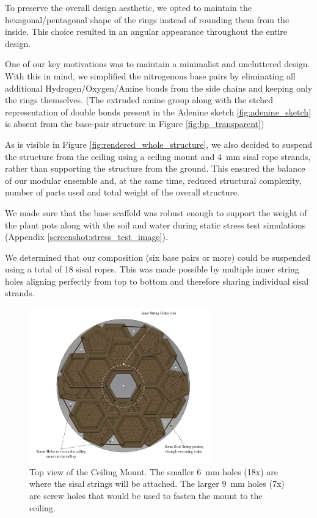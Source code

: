 \documentclass[12pt]{extarticle} %
\begin{document}
To preserve the overall design aesthetic, we opted to maintain the hexagonal/pentagonal shape of the rings instead of rounding them from the inside. This choice resulted in an angular appearance throughout the entire design.

One of our key motivations was to maintain a minimalist and uncluttered design. With this in mind, we simplified the nitrogenous base pairs by eliminating all additional Hydrogen/Oxygen/Amine bonds from the side chains and keeping only the rings themselves. (The extruded amine group along with the etched representation of double bonds present in the Adenine sketch \ref{fig:adenine_sketch} is absent from the base-pair structure in Figure \ref{fig:bp_transparent})   

As is visible in Figure \ref{fig:rendered_whole_structure}, we also decided to suspend the structure from the ceiling using a ceiling mount and 4 mm sisal rope strands, rather than supporting the structure from the ground.
This ensured the balance of our modular ensemble and, at the same time, reduced structural complexity, number of parts used and total weight of the overall structure.


\label{para:max_stress}
We made sure that the base scaffold was robust enough to support the weight of the plant pots along with the soil and water during static stress test simulations (Appendix \ref{screenshot:stress_test_image}).

We determined that our composition (six base pairs or more) could be suspended using a total of 18 sisal ropes. This was made possible by multiple inner string holes aligning perfectly from top to bottom and therefore sharing individual sisal strands.

\begin{figure}[!ht]
    \centering
    \includegraphics[width=0.7\textwidth]{images/screenshots/ceiling_mount_3d.png}
    \caption{Top view of the Ceiling Mount. The smaller 6 mm holes (18x) are where the sisal strings will be attached. The larger 9 mm holes (7x) are screw holes that would be used to fasten the mount to the ceiling.}
    \label{fig:ceiling_mount_annotated}
\end{figure}
\end{document}
